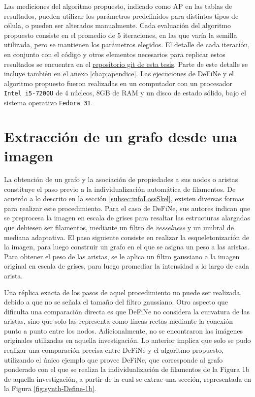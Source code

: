 Las mediciones del algoritmo propuesto, indicado como AP en las tablas de resultados, pueden utilizar los par\'ametros predefinidos para distintos tipos de c\'elula, o pueden ser alterados manualmente. Cada evaluaci\'on del algoritmo propuesto consiste en el promedio de 5 iteraciones, en las que var\'ia la semilla utilizada, pero se mantienen los par\'ametros elegidos. El detalle de cada iteraci\'on, en conjunto con el c\'odigo y otros elementos necesarios para replicar estos resultados se encuentra en el \href{https://gitlab.com/LeoXDXp/graph-crawler}{repositorio git de esta tesis}. Parte de este detalle se incluye tambi\'en en el anexo \ref{chap:apendice}.
Las ejecuciones de DeFiNe y el algoritmo propuesto fueron realizadas en un computador con un procesador {\tt Intel i5-7200U} de 4 n\'ucleos, 8GB de RAM y un disco de estado s\'olido, bajo el sistema operativo {\tt Fedora 31}.

\section{Extracci\'on de un grafo desde una imagen}
\label{sec:graphImageExtraction}
La obtenci\'on de un grafo y la asociaci\'on de propiedades a sus nodos o aristas constituye el paso previo a la individualizaci\'on autom\'atica de filamentos. De acuerdo a lo descrito en la secci\'on \ref{subsec:infoLossSkel}, existen diversas formas para realizar este procedimiento. Para el caso de DeFiNe, sus autores indican que se preprocesa la imagen en escala de grises para resaltar las estructuras alargadas que debiesen ser filamentos, mediante un filtro de {\it vesselness} y un umbral de mediana adaptativa. El paso siguiente consiste en realizar la esqueletonizaci\'on de la imagen, para luego construir un grafo en el que se asigna un peso a las aristas. 
Para obtener el peso de las aristas, se le aplica un filtro gaussiano a la imagen original en escala de grises, para luego promediar la intensidad a lo largo de cada arista.


Una r\'eplica exacta de los pasos de aquel procedimiento no puede ser realizada, debido a que no se se\~nala el tama\~no del filtro gaussiano. Otro aspecto que dificulta una comparaci\'on directa es que DeFiNe no considera la curvatura de las aristas, sino que solo las representa como l\'ineas rectas mediante la conexión punto a punto entre los nodos. Adicionalmente, no se encontraron las im\'agenes originales utilizadas en aquella investigaci\'on. Lo anterior implica que solo se pudo realizar una comparaci\'on precisa entre DeFiNe y el algoritmo propuesto, utilizando el \'unico ejemplo que provee DeFiNe, que corresponde al grafo ponderado con el que se realiza la individualizaci\'on de filamentos de la Figura 1b de aquella investigaci\'on, a partir de la cual se extrae una secci\'on, representada en la Figura \ref{fig:synth-Define-1b}.


